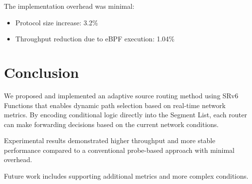 \documentclass[conference]{IEEEtran}
\begin{document}
The implementation overhead was minimal:

\begin{itemize}
  \item Protocol size increase: 3.2\%
  \item Throughput reduction due to eBPF execution: 1.04\%
\end{itemize}

\section{Conclusion}

We proposed and implemented an adaptive source routing method using SRv6 Functions that enables dynamic path selection based on real-time network metrics.
By encoding conditional logic directly into the Segment List, each router can make forwarding decisions based on the current network conditions.

Experimental results demonstrated higher throughput and more stable performance compared to a conventional probe-based approach with minimal overhead.

Future work includes supporting additional metrics and more complex conditions.



\end{document}
